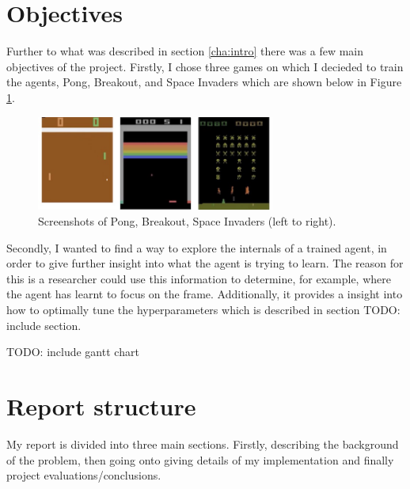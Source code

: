 \section{Objectives}
\label{intro:sec:obj}
Further to what was described in section \ref{cha:intro} there was a few main objectives of the project. Firstly, I chose three games on which I decieded to train the agents, Pong, Breakout, and Space Invaders which are shown below in Figure \ref{fig:atari-screenshot}.

\begin{figure}[htbp]
	\centering
	\includegraphics[width=0.7\textwidth]{chapters/chapter1/images/atari-combined.jpg}
	\caption{Screenshots of Pong, Breakout, Space Invaders (left to right).
		\label{fig:atari-screenshot}
	}
\end{figure}


Secondly, I wanted to find a way to explore the internals of a trained agent, in order to give further insight into what the agent is trying to learn. The reason for this is a researcher could use this information to determine, for example, where the agent has learnt to focus on the frame. Additionally, it provides a insight into how to optimally tune the hyperparameters which is described in section TODO: include section.

TODO: include gantt chart

\section{Report structure}
\label{intro:sec:report_struc}

My report is divided into three main sections. Firstly, describing the background of the problem, then going onto giving details of my implementation and finally project evaluations/conclusions.